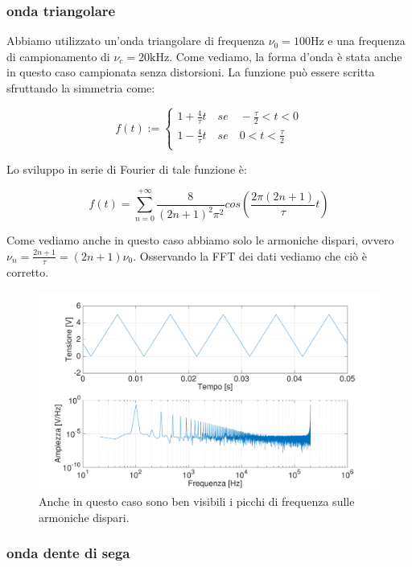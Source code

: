 \subsubsection{onda triangolare}
Abbiamo utilizzato un'onda triangolare di frequenza $\nu_0=100 \si{\hertz}$ e una frequenza di campionamento di $\nu_c=20\si{\kilo\hertz}$. Come vediamo, la forma d'onda è stata anche in questo caso campionata senza distorsioni. La funzione può essere scritta sfruttando la simmetria come:

\begin{displaymath}
f(t):=
\begin{cases}
1+\frac{4}{\tau}t \quad se \quad -\frac{\tau}{2}<t<0 \\
1-\frac{4}{\tau}t \quad se \quad 0<t<\frac{\tau}{2} \\ 
\end{cases}
\end{displaymath}

Lo sviluppo in serie di Fourier di tale funzione è:

\begin{equation}
f(t)=\sum_{n=0}^{+\infty}\frac{8}{(2n+1)^2\pi^2}cos (\frac{2\pi(2n+1)}{\tau}t)
\end{equation}

Come vediamo anche in questo caso abbiamo solo le armoniche dispari, ovvero $\nu_n=\frac{2n+1}{\tau}=(2n+1)\nu_0$. Osservando la FFT dei dati vediamo che ciò è corretto. 

\begin{figure}[H]
\centering
	\includegraphics[width=.73\textwidth]{../E13/latex/triangolare100hz@10000,200000.pdf}
	\caption{Anche in questo caso sono ben visibili i picchi di frequenza sulle armoniche dispari. }
	\label{triangolare}
\end{figure}

\subsubsection{onda dente di sega}


